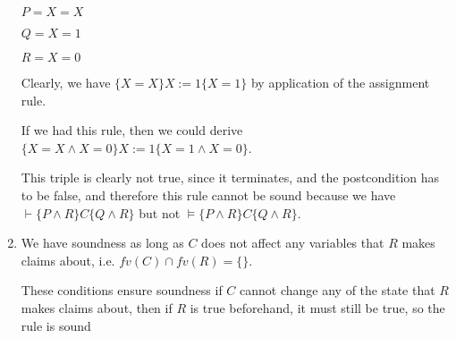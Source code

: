 \begin{enumerate}[label=(\alph*)]
  $P = X = X$

  $Q = X = 1$

  $R = X = 0$

  Clearly, we have $\{X=X\}X := 1\{X = 1\}$ by application of the assignment rule.

  If we had this rule, then we could derive $\{X=X \wedge X=0\}X := 1\{X = 1 \wedge X = 0\}$.

  This triple is clearly not true, since it terminates, and the postcondition has to be false, and therefore this rule cannot be sound because we have $\vdash \{P \wedge R\}C\{Q \wedge R\}$ but not $\vDash \{P \wedge R \}C\{Q \wedge R\}$.

  \item
    We have soundness as long as $C$ does not affect any variables that $R$ makes claims about, i.e. $fv(C) \cap fv(R) = \{\}$.

    These conditions ensure soundness if $C$ cannot change any of the state that $R$ makes claims about, then if $R$ is true beforehand, it must still be true, so the rule is sound
    
\end{enumerate}


